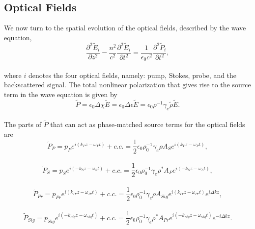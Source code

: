 \documentclass[%
  reprint,
  superscriptaddress,
  amsmath,amssymb,
  aps,
  prapplied,
]{revtex4-2}
\begin{document}
\subsection{Optical Fields}
\label{Coupled-Wave Equations:Optical Fields}

We now turn to the spatial evolution of the optical fields, described by the wave equation,
\\
\begin{equation}
    \frac{\partial^{2}\tilde{E}_{i}}{\partial z^{2}} - \frac{n^{2}}{c^{2}}\frac{\partial^{2}\tilde{E}_{i}}{\partial t^{2}} = \frac{1}{\epsilon_{0}c^{2}}\frac{\partial^{2}\tilde{P}_{i}}{\partial t^{2}},
    \label{eq:Wave equation}
\end{equation}
\\
where $i$ denotes the four optical fields, namely: pump, Stokes, probe, and the backscattered signal. The total nonlinear polarization that gives rise to the source term in the wave equation is given by
\\
\begin{equation}
    \tilde{P} = \epsilon_{0}\Delta\chi\tilde{E} = \epsilon_{0}\Delta\epsilon\tilde{E} = \epsilon_{0}\rho^{-1}\gamma_{e}\tilde{\rho}\tilde{E}.
\end{equation}
\\
The parts of $\tilde{P}$ that can act as phase-matched source terms for the optical fields are
\\
\begin{equation}
    \tilde{P}_{P} = p_{P}e^{i(k_{P}z - \omega_{P} t)} + c.c. = \frac{1}{2}\epsilon_{0}\rho_{0}^{-1}\gamma_{e}\rho A_{S}e^{i(k_{P}z - \omega_{P} t)},
    \label{eq:Pump phase-matched source term}
\end{equation}
\\
\begin{equation}
    \tilde{P}_{S} = p_{S}e^{i(-k_{S}z - \omega_{S} t)} + c.c. = \frac{1}{2}\epsilon_{0}\rho_{0}^{-1}\gamma_{e}\rho^{*} A_{P}e^{i(-k_{S}z - \omega_{S} t)},
    \label{eq:Stokes phase-matched source term}
\end{equation}
\\
\begin{equation}
    \tilde{P}_{Pr} = p_{Pr}e^{i(k_{Pr}z - \omega_{Pr} t)} + c.c. = \frac{1}{2}\epsilon_{0}\rho_{0}^{-1}\gamma_{e}\rho A_{Sig}e^{i(k_{Pr}z - \omega_{Pr} t)}e^{i\Delta kz},
    \label{eq:Probe phase-matched source term}
\end{equation}
\\
\begin{equation}
    \tilde{P}_{Sig} = p_{Sig}e^{i(-k_{Sig}z - \omega_{Sig} t)} + c.c. = \frac{1}{2}\epsilon_{0}\rho_{0}^{-1}\gamma_{e}\rho^{*} A_{Pr}e^{i(-k_{Sig}z - \omega_{Sig} t)}e^{-i\Delta kz}.
    \label{eq:Signal phase-matched source term}
\end{equation}
\end{document}
